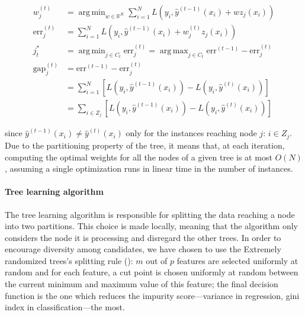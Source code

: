 \documentclass{article}
\DeclareMathOperator*{\argmin}{arg\,min}
\DeclareMathOperator*{\argmax}{arg\,max}
\begin{document}
\begin{align}\label{eq:nodeSel}
w_j^{(t)} &= \argmin_{w \in \mathbb{R}^K} \sum_{i=1}^{N} L \left(y_i, 
\hat{y}^{(t-1)}(x_i) + w z_j(x_i)  \right) \\
\text{err}_j^{(t)} &= \sum_{i=1}^{N} L \left(y_i, \hat{y}^{(t-1)}(x_i) + 
w_j^{(t)} z_j(x_i)  \right) \\
j_t^* &= \argmin_{j \in C_t} \text{err}_j^{(t)} = \argmax_{j \in C_t} 
\text{err}^{(t-1)} - \text{err}_j^{(t)} \\
\text{gap}_j^{(t)} &= \text{err}^{(t-1)} - \text{err}_j^{(t)} \\
&= \sum_{i=1}^{N} \left[ L\left(y_i, \hat{y}^{(t-1)}(x_i)\right) - L\left(y_i, 
\hat{y}^{(t)}(x_i)\right) \right] \\
&= \sum_{i\in Z_j} \left[ L\left(y_i, \hat{y}^{(t-1)}(x_i)\right) - L\left(y_i, 
\hat{y}^{(t)}(x_i)\right) \right]
\end{align}

since $\hat{y}^{(t-1)}(x_i) \neq \hat{y}^{(t)}(x_i)$ only for the instances 
reaching node $j$: $i \in Z_j$. Due to the partitioning property of the tree, 
it means that, at each iteration, computing the optimal weights for all the 
nodes of a given tree is at most $O(N)$, assuming a single optimization runs in 
linear time in the number of instances.

\paragraph{Tree learning algorithm}
The tree learning algorithm is responsible for splitting the data reaching a 
node into two partitions. This choice is made locally, meaning that the 
algorithm only considers the node it is processing and disregard the other 
trees. In order to encourage diversity among candidates, we have chosen to use 
the Extremely randomized trees's splitting rule (\cite{extratrees}): $m$ out of 
$p$ features are selected uniformly at random and for each feature, a cut point 
is chosen uniformly at random between the current minimum and maximum value of 
this feature; the final decision function is the one which reduces the impurity 
score---variance in regression, gini index in classification---the most.
\end{document}

